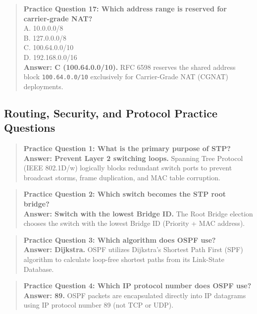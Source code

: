 \begin{quote}
\textbf{Practice Question 17: Which address range is reserved for carrier-grade NAT?}\\[4pt]
\quad A. 10.0.0.0/8\\[2pt]
\quad B. 127.0.0.0/8\\[2pt]
\quad C. 100.64.0.0/10\\[2pt]
\quad D. 192.168.0.0/16\\[2pt]
\vspace{4pt}
\textbf{Answer: C (100.64.0.0/10).} RFC 6598 reserves the shared address block \texttt{100.64.0.0/10} exclusively for Carrier-Grade NAT (CGNAT) deployments.
\end{quote}

\newpage

\subsection{Routing, Security, and Protocol Practice Questions}
\begin{quote}
\textbf{Practice Question 1: What is the primary purpose of STP?}\\[4pt]
\vspace{4pt}
\textbf{Answer: Prevent Layer 2 switching loops.} Spanning Tree Protocol (IEEE 802.1D/w) logically blocks redundant switch ports to prevent broadcast storms, frame duplication, and MAC table corruption.
\end{quote}
\begin{quote}
\textbf{Practice Question 2: Which switch becomes the STP root bridge?}\\[4pt]
\vspace{4pt}
\textbf{Answer: Switch with the lowest Bridge ID.} The Root Bridge election chooses the switch with the lowest Bridge ID (Priority + MAC address).
\end{quote}
\begin{quote}
\textbf{Practice Question 3: Which algorithm does OSPF use?}\\[4pt]
\vspace{4pt}
\textbf{Answer: Dijkstra.} OSPF utilizes Dijkstra's Shortest Path First (SPF) algorithm to calculate loop-free shortest paths from its Link-State Database.
\end{quote}
\begin{quote}
\textbf{Practice Question 4: Which IP protocol number does OSPF use?}\\[4pt]
\vspace{4pt}
\textbf{Answer: 89.} OSPF packets are encapsulated directly into IP datagrams using IP protocol number 89 (not TCP or UDP).
\end{quote}
